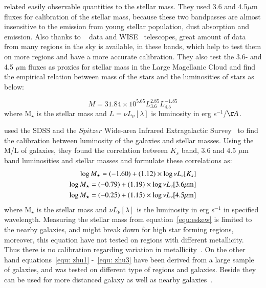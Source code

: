 \cite{Eskew12} related easily observable quantities to the stellar mass. 
They used 3.6 and 4.5$\mu$m fluxes for calibration of the stellar mass, because these two bandpasses are almost insensitive to the emission from young stellar population, dust absorption and emission. 
Also thanks to \Spitzer~\citep{Wener04} data and WISE~\citep{Wright10} telescopes, great amount of data from many regions in the sky is available, in these bands, which help to test them on more regions and have a more accurate calibration. 
They also test the 3.6- and 4.5 $\mu$m fluxes as proxies for stellar mass in the Large Magellanic Cloud and find the empirical relation between mass of the stars and the luminosities of stars as below:

\begin{equation}
\label{equ:eskew}
M = 31.84 \times 10^{5.65} L_{3.6}^{2.85} L_{4.5}^{-1.85}
\end{equation}
where M$_{\star}$ is the stellar mass and $L = \nu L_{\nu}[\lambda]$ is luminosity in erg s$^{-1}$/$\AA$.
 
\cite{Zhu10} used the SDSS and the $Spitzer$ Wide-area Infrared Extragalactic Survey~\citep[SWIRE;][] {Lonsdale03} to find the calibration between luminosity of the galaxies and stellar masses. 
Using the M/L of galaxies, they found the correlation between $K_s$ band, 3.6 and 4.5 $\mu$m band luminosities and stellar masses and formulate these correlations as:
\begin{align}
\label{equ: zhu1}
\log M_{\star} = (-1.60 ) + (1.12)\times \log \nu L_{\nu}[K_s]\\
\log M_{\star} = (-0.79) + (1.19)\times \log \nu L_{\nu}[3.6\mu \rm m]\\
\label{equ: zhu3}
\log M_{\star} = (-0.25) + (1.15)\times \log \nu L_{\nu}[4.5\mu \rm m] 
\end{align}
where M$_{\star}$ is the stellar mass and $ \nu L_{\nu}[\lambda]$ is the luminosity in erg s$^{-1}$ in specified wavelength. 
Measuring the stellar mass from equation~\ref{equ:eskew} is limited to the nearby galaxies, and might break down for high star forming regions, moreover, this equation have not tested on regions with different metallicity. 
Thus there is no calibration regarding variation in  metallicity~\citep{Eskew12}. 
On the other hand equations~\ref{equ: zhu1} -~\ref{equ: zhu3} have been derived from a large sample of galaxies, and was tested on different type of regions and galaxies. 
Beside they can be used for more distanced galaxy as well as nearby galaxies~\citep{Zhu10}. 

